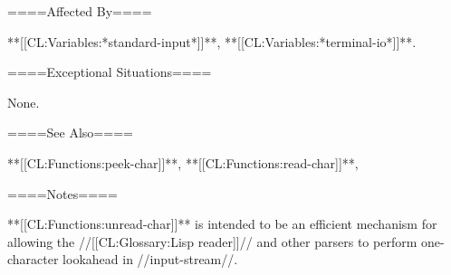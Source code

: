 ====Affected By====

**[[CL:Variables:*standard-input*]]**, **[[CL:Variables:*terminal-io*]]**.

====Exceptional Situations====

None.

====See Also====

**[[CL:Functions:peek-char]]**, **[[CL:Functions:read-char]]**, {\secref\StreamConcepts}

====Notes====

**[[CL:Functions:unread-char]]** is intended to be an efficient mechanism for allowing the //[[CL:Glossary:Lisp reader]]// and other parsers to perform one-character lookahead in //input-stream//.

 
